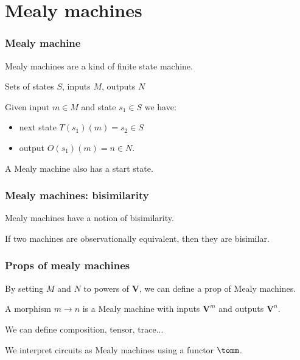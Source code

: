 \section{Mealy machines}

\begin{frame}
    \frametitle{Mealy machine}

    Mealy machines are a kind of \alert{finite state machine}.

    \pause

    Sets of \alert{states} \(S\), \pause \alert{inputs} \(M\), \pause \alert{outputs} \(N\)

    \pause

    Given input \(m \in M\) and state \(s_1 \in S\) we have:
    
    \pause

    \begin{itemize}
        \item \alert{next state} \(T(s_1)(m) = s_2 \in S\)
        \pause
        \item \alert{output} \(O(s_1)(m) = n \in N\).
    \end{itemize}

    \pause

    A Mealy machine also has a \alert{start state}.

    \pause

    \begin{center}
        
    \end{center}

\end{frame}

\begin{frame}
    \frametitle{Mealy machines: bisimilarity}

    Mealy machines have a notion of \alert{bisimilarity}.

    \pause

    If two machines are \alert{observationally equivalent}, then they are bisimilar.

\end{frame}

\begin{frame}
    \frametitle{Props of mealy machines}

    By setting \(M\) and \(N\) to powers of \(\textbf{V}\), we can define a prop of Mealy machines.

    \pause

    A morphism \(m \to n\) is a Mealy machine with inputs \(\textbf{V}^m\) and outputs \(\textbf{V}^n\).
    
    \pause

    We can define composition, tensor, trace...

    \pause

    We interpret circuits as Mealy machines using a functor \(\tomm\).

\end{frame}

